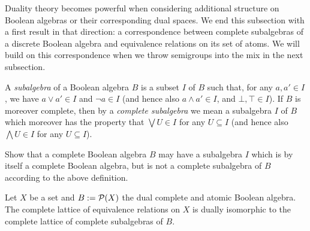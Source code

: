 Duality theory becomes powerful when considering additional structure on Boolean algebras or their corresponding dual spaces. We end this subsection with a first result in that direction: a correspondence between complete subalgebras of a discrete Boolean algebra and equivalence relations on its set of atoms. We will build on this correspondence when we throw semigroups into the mix in the next subsection.
\begin{definition}
  A \emph{subalgebra} of a Boolean algebra $B$ is a subset $I$ of $B$ such that, for any $a, a' \in I$, we have $a \vee a' \in I$ and $\neg a \in I$ (and hence also $a \wedge a' \in I$, and $\bot, \top \in I$). If $B$ is moreover complete, then by a \emph{complete subalgebra} we mean a subalgebra $I$ of $B$ which moreover has the property that $\bigvee U \in I$ for any $U \subseteq I$ (and hence also $\bigwedge U \in I$ for any $U \subseteq I$).
\end{definition}
\begin{exercise}\medium
Show that a complete Boolean algebra $B$ may have a subalgebra $I$ which is by itself a complete Boolean algebra, but is not a complete subalgebra of $B$ according to the above definition.
\end{exercise}
\begin{theorem}\label{thm:disc-quot-sub}
  Let $X$ be a set and $B := \mathcal{P}(X)$ the dual complete and atomic Boolean algebra. The complete lattice of equivalence relations on $X$ is dually isomorphic to the complete lattice of complete subalgebras of $B$.
\end{theorem}

